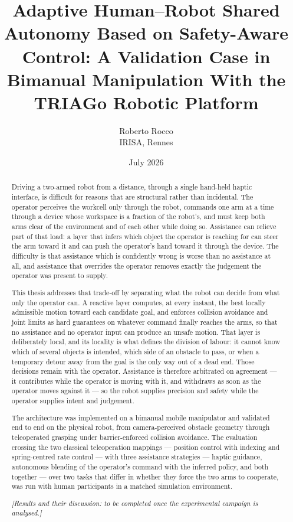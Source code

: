 \documentclass[12pt,a4paper,twoside,openright]{report}
\title{\textbf{Adaptive Human--Robot Shared Autonomy Based on Safety-Aware Control: A Validation Case in Bimanual Manipulation With the TRIAGo Robotic Platform}}
\author{Roberto Rocco \\ IRISA, Rennes}
\date{July 2026}
\begin{document}
\maketitle

\begin{abstract}
\noindent Driving a two-armed robot from a distance, through a single hand-held haptic interface, is difficult for reasons that are structural rather than incidental. The operator perceives the workcell only through the robot, commands one arm at a time through a device whose workspace is a fraction of the robot's, and must keep both arms clear of the environment and of each other while doing so. Assistance can relieve part of that load: a layer that infers which object the operator is reaching for can steer the arm toward it and can push the operator's hand toward it through the device. The difficulty is that assistance which is confidently wrong is worse than no assistance at all, and assistance that overrides the operator removes exactly the judgement the operator was present to supply.

This thesis addresses that trade-off by separating what the robot can decide from what only the operator can. A reactive layer computes, at every instant, the best locally admissible motion toward each candidate goal, and enforces collision avoidance and joint limits as hard guarantees on whatever command finally reaches the arms, so that no assistance and no operator input can produce an unsafe motion. That layer is deliberately local, and its locality is what defines the division of labour: it cannot know which of several objects is intended, which side of an obstacle to pass, or when a temporary detour away from the goal is the only way out of a dead end. Those decisions remain with the operator. Assistance is therefore arbitrated on agreement --- it contributes while the operator is moving with it, and withdraws as soon as the operator moves against it --- so the robot supplies precision and safety while the operator supplies intent and judgement.

The architecture was implemented on a bimanual mobile manipulator and validated end to end on the physical robot, from camera-perceived obstacle geometry through teleoperated grasping under barrier-enforced collision avoidance. The evaluation crossing the two classical teleoperation mappings --- position control with indexing and spring-centred rate control --- with three assistance strategies --- haptic guidance, autonomous blending of the operator's command with the inferred policy, and both together --- over two tasks that differ in whether they force the two arms to cooperate, was run with human participants in a matched simulation environment.

\textit{[Results and their discussion: to be completed once the experimental campaign is analysed.]}
\end{abstract}
\end{document}
